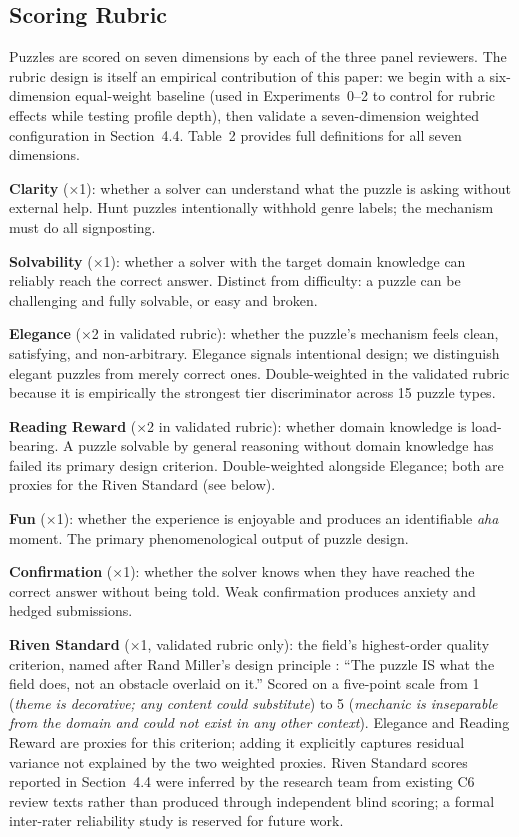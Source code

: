\subsection{Scoring Rubric}
\label{sec:rubric}

Puzzles are scored on seven dimensions by each of the three panel reviewers. The rubric design is itself an empirical contribution of this paper: we begin with a six-dimension equal-weight baseline (used in Experiments~0--2 to control for rubric effects while testing profile depth), then validate a seven-dimension weighted configuration in Section~4.4. Table~2 provides full definitions for all seven dimensions.

\textbf{Clarity} (×1): whether a solver can understand what the puzzle is asking without external help. Hunt puzzles intentionally withhold genre labels; the mechanism must do all signposting.

\textbf{Solvability} (×1): whether a solver with the target domain knowledge can reliably reach the correct answer. Distinct from difficulty: a puzzle can be challenging and fully solvable, or easy and broken.

\textbf{Elegance} (×2 in validated rubric): whether the puzzle's mechanism feels clean, satisfying, and non-arbitrary. Elegance signals intentional design; we distinguish elegant puzzles from merely correct ones. Double-weighted in the validated rubric because it is empirically the strongest tier discriminator across 15 puzzle types.

\textbf{Reading Reward} (×2 in validated rubric): whether domain knowledge is load-bearing. A puzzle solvable by general reasoning without domain knowledge has failed its primary design criterion. Double-weighted alongside Elegance; both are proxies for the Riven Standard (see below).

\textbf{Fun} (×1): whether the experience is enjoyable and produces an identifiable \emph{aha} moment. The primary phenomenological output of puzzle design.

\textbf{Confirmation} (×1): whether the solver knows when they have reached the correct answer without being told. Weak confirmation produces anxiety and hedged submissions.

\textbf{Riven Standard} (×1, validated rubric only): the field's highest-order quality criterion, named after Rand Miller's design principle \cite{miller2016riven}: ``The puzzle IS what the field does, not an obstacle overlaid on it.'' Scored on a five-point scale from 1 (\emph{theme is decorative; any content could substitute}) to 5 (\emph{mechanic is inseparable from the domain and could not exist in any other context}). Elegance and Reading Reward are proxies for this criterion; adding it explicitly captures residual variance not explained by the two weighted proxies. Riven Standard scores reported in Section~4.4 were inferred by the research team from existing C6 review texts rather than produced through independent blind scoring; a formal inter-rater reliability study is reserved for future work.

